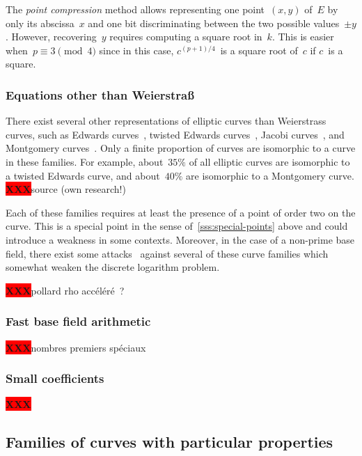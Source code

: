 \documentclass{article}
\def\XXX{{\colorbox{red}{{\color{white}\bfseries XXX}}}}
\begin{document}
The \emph{point compression} method allows representing
one point~$(x,y)$ of~$E$ by only its abscissa~$x$ and
one bit discriminating between the two possible values~$±y$.
However, recovering~$y$ requires computing a square root in~$k$.
This is easier when~$p ≡ 3 \pmod{4}$ since
in this case, $c^{(p+1)/4}$~is a square root of~$c$ if $c$~is a square.

\subsubsection{Equations other than Weierstraß}

There exist several other representations of elliptic curves
than Weierstrass curves, such as
Edwards curves~\cite{ams2007edwards},
twisted Edwards curves~\cite{africa2008bbjl},
Jacobi curves~\cite{aaaaec2003bj},
and Montgomery curves~\cite{mathcomp1987montgomery}.
Only a finite proportion of curves are isomorphic
to a curve in these families.
For example, about~$35\%$ of all elliptic curves
are isomorphic to a twisted Edwards curve,
and about~$40\%$ are isomorphic to a Montgomery curve.
\XXX source (own research!)

Each of these families requires at least
the presence of a point of order two on the curve.
This is a special point in the sense of~\ref{sss:special-points} above
and could introduce a weakness in some contexts.
Moreover, in the case of a non-prime base field,
there exist some attacks~\cite{jcrypto2014fghr}
against several of these curve families
which somewhat weaken the discrete logarithm problem.

\XXX pollard rho accéléré ?

\subsubsection{Fast base field arithmetic}
\label{sss:special-fast}

\XXX nombres premiers spéciaux

\subsubsection{Small coefficients}

\XXX

\subsection{Families of curves with particular properties}
\label{ss:particular}
\end{document}
